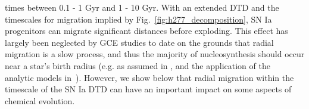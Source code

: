 \documentclass[draft2.tex]{subfiles}
\begin{document}
times between 0.1 - 1 Gyr and 1 - 10 Gyr. 
With an extended DTD and the timescales for migration implied by 
Fig.~\ref{fig:h277_decomposition}, SN Ia progenitors can migrate significant 
distances before exploding. 
This effect has largely been neglected by GCE studies to date on the grounds 
that radial migration is a slow process, and thus the majority of 
nucleosynthesis should occur near a star's birth radius (e.g. as assumed in 
\citealp{Minchev2013}, and the application of the~\citealp*{Weinberg2017} 
analytic models in~\citealp{Feuillet2018}). 
However, we show below that radial migration within the timescale of the SN Ia 
DTD can have an important impact on some aspects of chemical evolution. 

\end{document}
